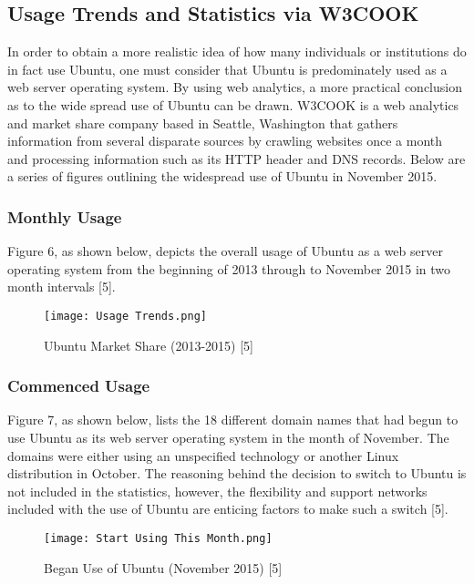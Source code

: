 \documentclass[11pt]{article}
\newcommand{\forceindent}{\leavevmode{\parindent=1em\indent}}
\begin{document}
\subsection{Usage Trends and Statistics via W3COOK}


\forceindent In order to obtain a more realistic idea of how many individuals or institutions do in fact use Ubuntu, one must consider that Ubuntu is predominately used as a web server operating system. By using web analytics, a more practical conclusion as to the wide spread use of Ubuntu can be drawn. W3COOK is a web analytics and market share company based in Seattle, Washington that gathers information from several disparate sources by crawling websites once a month and processing information such as its HTTP header and DNS records. Below are a series of figures outlining the widespread use of Ubuntu in November 2015.

\subsubsection{Monthly Usage}

\forceindent Figure 6, as shown below, depicts the overall usage of Ubuntu as a web server operating system from the beginning of 2013 through to November 2015 in two month intervals [5].\\

\begin{figure}[h!]
  \centering
    \caption{Ubuntu Market Share (2013-2015) [5]}
{\texttt{[image: Usage Trends.png]}}
\end{figure}

\subsubsection{Commenced Usage}

\forceindent Figure 7, as shown below, lists the 18 different domain names that had begun to use Ubuntu as its web server operating system in the month of November. The domains were either using an unspecified technology or another Linux distribution in October. The reasoning behind the decision to switch to Ubuntu is not included in the statistics, however, the flexibility and support networks included with the use of Ubuntu are enticing factors to make such a switch [5].\\

\begin{figure}[h!]
  \centering
    \caption{Began Use of Ubuntu (November 2015) [5]}
{\texttt{[image: Start Using This Month.png]}}
\end{figure}
\end{document}
